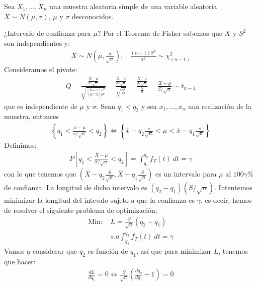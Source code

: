 \begin{ejemplo}
    Sea $X_1,...,X_n$ una muestra aleatoria simple de una variable aleatoria $X \sim N(\mu,\sigma)$, $\mu$ y $\sigma$ desconocidos.

    ¿Intervalo de confianza para $\mu$? Por el Teorema de Fisher sabemos que $\overline{X}$ y $S^2$ son independientes y:
    \begin{align*}
        \overline{X} \sim N\left( \mu, \frac{\sigma}{\sqrt{n}} \right), \ \ \ \ \frac{(n-1)S^2}{\sigma^2} \sim \chi^2_{(n-1)}
    \end{align*}
    Consideramos el pivote:
    \begin{align*}
        Q = \frac{\frac{\overline{X} -\mu}{\sigma/\sqrt{n}}}{\sqrt{\frac{(n-1)S^2}{(n-1)\sigma^2}}} = \frac{\frac{\overline{X} -\mu}{\sigma/\sqrt{n}}}{\sqrt{\frac{S^2}{\sigma^2}}} = \frac{\frac{\overline{X} -\mu}{\sigma/\sqrt{n}}}{{\frac{S}{\sigma}}} = \frac{\overline{X} - \mu}{S/\sqrt{n}} \sim t_{n-1}
    \end{align*}
    que es independiente de $\mu$ y $\sigma$. Sean $q_1 < q_2$ y sea $x_1,...,x_n$ una realización de la muestra, entonces
    \begin{align*}
        \left\{ q_1 < \frac{\overline{x} -\mu}{s/\sqrt{n}} < q_2 \right\} \Longleftrightarrow \left\{ \overline{x} - q_2 \frac{s}{\sqrt{n}} < \mu < \overline{x} -q_1\frac{s}{\sqrt{n}}\right\}
    \end{align*}
    Definimos:
    \begin{align*}
        P\left[  q_1 < \frac{\overline{X} -\mu}{S/\sqrt{n}} < q_2 \right] = \int_{q_1}^{q_2}{f_T(t) \ dt} = \gamma
    \end{align*}
    con lo que tenemos que $\left(\overline{X} - q_2 \frac{S}{\sqrt{n}} , \overline{X} -q_1\frac{S}{\sqrt{n}}\right)$ es un intervalo para $\mu$ al $100\gamma \%$ de confianza. La longitud de dicho intervalo es $(q_2 - q_1)(S/\sqrt{n})$. Intentemos minimizar la longitud del intevalo sujeto a que la confianza es $\gamma$, es decir, hemos de resolver el siguiente problema de optimización:
    \begin{align*}
        \text{Min: } & L = \frac{S}{\sqrt{n}}(q_2 - q_1)          \\
                     & s.a \int_{q_1}^{q_2}{f_T(t) \ dt} = \gamma
    \end{align*}
    Vamos a considerar que $q_2$ es función de $q_1$, así que para minimizar $L$, tenemos que hacer:
    \begin{align*}
        \frac{d L}{d q_1} = 0 \Longleftrightarrow \frac{S}{\sqrt{n}}\left( \frac{d q_2}{d q_1} -1 \right) = 0

\end{align*}
\end{ejemplo}

